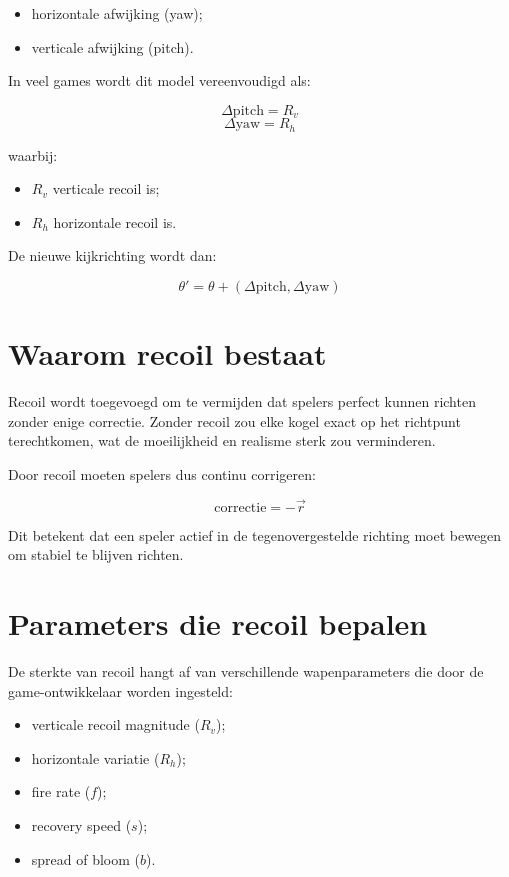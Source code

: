 \begin{itemize}
    \item horizontale afwijking (yaw);
    \item verticale afwijking (pitch).
\end{itemize}

In veel games wordt dit model vereenvoudigd als:

\[
\Delta \text{pitch} = R_v
\]
\[
\Delta \text{yaw} = R_h
\]

waarbij:
\begin{itemize}
    \item $R_v$ verticale recoil is;
    \item $R_h$ horizontale recoil is.
\end{itemize}

De nieuwe kijkrichting wordt dan:

\[
\theta' = \theta + (\Delta \text{pitch}, \Delta \text{yaw})
\]

\section{Waarom recoil bestaat}

Recoil wordt toegevoegd om te vermijden dat spelers perfect kunnen richten zonder enige correctie. Zonder recoil zou elke kogel exact op het richtpunt terechtkomen, wat de moeilijkheid en realisme sterk zou verminderen.

Door recoil moeten spelers dus continu corrigeren:

\[
\text{correctie} = - \vec{r}
\]

Dit betekent dat een speler actief in de tegenovergestelde richting moet bewegen om stabiel te blijven richten.
\newpage
\section{Parameters die recoil bepalen}

De sterkte van recoil hangt af van verschillende wapenparameters die door de game-ontwikkelaar worden ingesteld:

\begin{itemize}
    \item verticale recoil magnitude ($R_v$);
    \item horizontale variatie ($R_h$);
    \item fire rate ($f$);
    \item recovery speed ($s$);
    \item spread of bloom ($b$).
\end{itemize}

